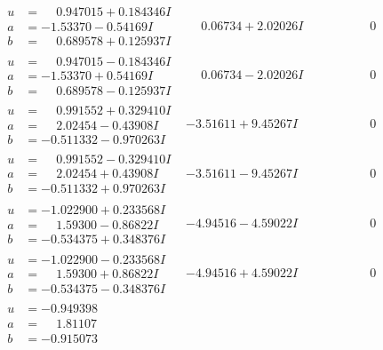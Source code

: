 \documentclass[1p]{elsarticle_modified}
\theoremstyle{definition}
\begin{document}
$$\begin{array}{c|c|c}
\begin{aligned}
u &= \phantom{-}0.947015 + 0.184346 I \\
a &= -1.53370 - 0.54169 I \\
b &= \phantom{-}0.689578 + 0.125937 I\end{aligned}
 & \phantom{-}0.06734 + 2.02026 I & \phantom{-0.000000 } 0 \\ \hline\begin{aligned}
u &= \phantom{-}0.947015 - 0.184346 I \\
a &= -1.53370 + 0.54169 I \\
b &= \phantom{-}0.689578 - 0.125937 I\end{aligned}
 & \phantom{-}0.06734 - 2.02026 I & \phantom{-0.000000 } 0 \\ \hline\begin{aligned}
u &= \phantom{-}0.991552 + 0.329410 I \\
a &= \phantom{-}2.02454 - 0.43908 I \\
b &= -0.511332 - 0.970263 I\end{aligned}
 & -3.51611 + 9.45267 I & \phantom{-0.000000 } 0 \\ \hline\begin{aligned}
u &= \phantom{-}0.991552 - 0.329410 I \\
a &= \phantom{-}2.02454 + 0.43908 I \\
b &= -0.511332 + 0.970263 I\end{aligned}
 & -3.51611 - 9.45267 I & \phantom{-0.000000 } 0 \\ \hline\begin{aligned}
u &= -1.022900 + 0.233568 I \\
a &= \phantom{-}1.59300 - 0.86822 I \\
b &= -0.534375 + 0.348376 I\end{aligned}
 & -4.94516 - 4.59022 I & \phantom{-0.000000 } 0 \\ \hline\begin{aligned}
u &= -1.022900 - 0.233568 I \\
a &= \phantom{-}1.59300 + 0.86822 I \\
b &= -0.534375 - 0.348376 I\end{aligned}
 & -4.94516 + 4.59022 I & \phantom{-0.000000 } 0 \\ \hline\begin{aligned}
u &= -0.949398\phantom{ +0.000000I} \\
a &= \phantom{-}1.81107\phantom{ +0.000000I} \\
b &= -0.915073\phantom{ +0.000000I}\end{aligned}

\end{array}$$
\end{document}
